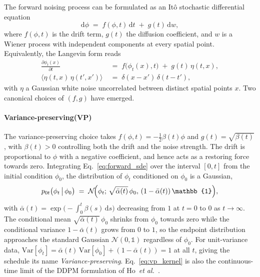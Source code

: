 \documentclass[reprint,twocolumn,superscriptaddress,preprintnumbers,amsmath,amssymb,aps,prd,floatfix]{revtex4-2}
\def\Eq#1{Eq.~\eqref{#1}}
\begin{document}
The forward noising process can be formulated as an It\^o stochastic differential equation~\cite{Song2021SDE}
\begin{equation}
\mathrm{d}\phi \;=\; f(\phi,t)\,\mathrm{d}t \;+\; g(t)\,\mathrm{d}w,
\label{eq:forward_sde}
\end{equation}
where $f(\phi,t)$ is the drift term, $g(t)$ the diffusion coefficient, and $w$ is a Wiener process with independent components at every spatial point. Equivalently, the Langevin form reads
\begin{equation}
\begin{aligned}
\frac{\partial \phi_t(x)}{\partial t} &\;=\; f\!\bigl(\phi_t(x),t\bigr) \;+\; g(t)\,\eta(t,x),\\
\bigl\langle \eta(t,x)\,\eta(t',x')\bigr\rangle &\;=\; \delta(x-x')\,\delta(t-t'),
\end{aligned}
\label{eq:forward_langevin}
\end{equation}
with $\eta$ a Gaussian white noise uncorrelated between distinct spatial points $x$. Two canonical choices of $(f,g)$ have emerged.

\paragraph{Variance-preserving(VP)}
The variance-preserving choice takes $f(\phi,t)=-\tfrac{1}{2}\beta(t)\phi$ and $g(t)=\sqrt{\beta(t)}$, with $\beta(t)>0$ controlling both the drift and the noise strength. The drift is proportional to $\phi$ with a negative coefficient, and hence acts as a restoring force towards zero. Integrating \Eq{eq:forward_sde} over the interval $[0,t]$ from the initial condition $\phi_0$, the distribution of $\phi_t$ conditioned on $\phi_0$ is a Gaussian,
\begin{equation}
p_{0t}\bigl(\phi_t\,\bigl|\,\phi_0\bigr) \;=\; \mathcal{N}\!\Bigl(\phi_t;\,\sqrt{\bar\alpha(t)}\,\phi_0,\,(1-\bar\alpha(t))\,\mathbb{1}\Bigr),
\label{eq:vp_kernel}
\end{equation}
with $\bar\alpha(t)=\exp\!\bigl(-\int_{0}^{t}\beta(s)\,\mathrm{d}s\bigr)$ decreasing from $1$ at $t=0$ to $0$ as $t\to\infty$. The conditional mean $\sqrt{\bar\alpha(t)}\,\phi_0$ shrinks from $\phi_0$ towards zero while the conditional variance $1-\bar\alpha(t)$ grows from $0$ to $1$, so the endpoint distribution approaches the standard Gaussian $\mathcal{N}(0,\mathbb{1})$ regardless of $\phi_0$. For unit-variance data, $\mathrm{Var}[\phi_t]=\bar\alpha(t)\,\mathrm{Var}[\phi_0]+(1-\bar\alpha(t))=1$ at all $t$, giving the schedule its name \textit{Variance-preserving}. \Eq{eq:vp_kernel} is also the continuous-time limit of the DDPM formulation of Ho~\emph{et al.}~\cite{Ho2020DDPM}.
\end{document}
